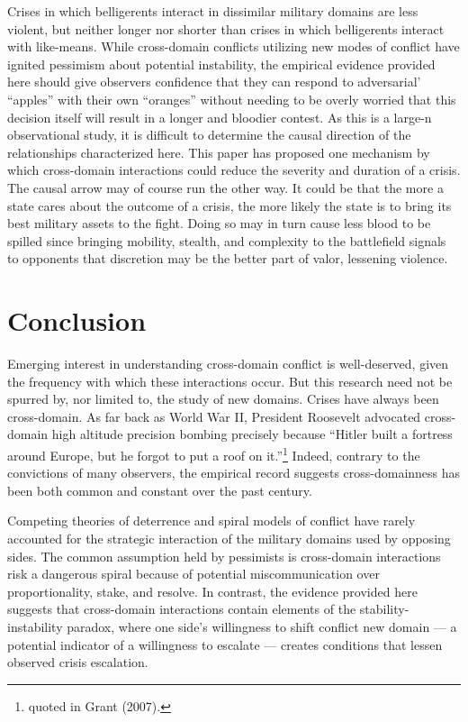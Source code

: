 \documentclass[
]{article}
\begin{document}
Crises in which belligerents interact in dissimilar military domains are less violent, but neither longer nor shorter than crises in which belligerents interact with like-means. While cross-domain conflicts utilizing new modes of conflict have ignited pessimism about potential instability, the empirical evidence provided here should give observers confidence that they can respond to adversarial' ``apples'' with their own ``oranges'' without needing to be overly worried that this decision itself will result in a longer and bloodier contest. As this is a large-n observational study, it is difficult to determine the causal direction of the relationships characterized here. This paper has proposed one mechanism by which cross-domain interactions could reduce the severity and duration of a crisis. The causal arrow may of course run the other way. It could be that the more a state cares about the outcome of a crisis, the more likely the state is to bring its best military assets to the fight. Doing so may in turn cause less blood to be spilled since bringing mobility, stealth, and complexity to the battlefield signals to opponents that discretion may be the better part of valor, lessening violence.

\hypertarget{conclusion}{%
\section{Conclusion}\label{conclusion}}

Emerging interest in understanding cross-domain conflict is well-deserved, given the frequency with which these interactions occur. But this research need not be spurred by, nor limited to, the study of new domains. Crises have always been cross-domain. As far back as World War II, President Roosevelt advocated cross-domain high altitude precision bombing precisely because ``Hitler built a fortress around Europe, but he forgot to put a roof on it.''\footnote{quoted in Grant (2007).} Indeed, contrary to the convictions of many observers, the empirical record suggests cross-domainness has been both common and constant over the past century.

Competing theories of deterrence and spiral models of conflict have rarely accounted for the strategic interaction of the military domains used by opposing sides. The common assumption held by pessimists is cross-domain interactions risk a dangerous spiral because of potential miscommunication over proportionality, stake, and resolve. In contrast, the evidence provided here suggests that cross-domain interactions contain elements of the stability-instability paradox, where one side's willingness to shift conflict new domain --- a potential indicator of a willingness to escalate --- creates conditions that lessen observed crisis escalation.
\end{document}

